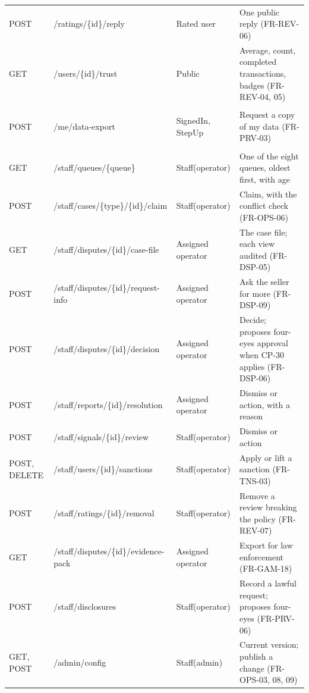\documentclass[11pt,a4paper]{article}
\begin{document}
{\begin{longtable}{@{}>{\ttfamily\raggedright\arraybackslash}p{1.55cm}>{\ttfamily\raggedright\arraybackslash}p{4.8cm}>{\raggedright\arraybackslash}p{2.4cm}>{\raggedright\arraybackslash}p{6.1cm}@{}}
POST & /\allowbreak ratings/\allowbreak \{id\}/\allowbreak reply & Rated user & One public reply (FR-REV-06) \\
GET & /\allowbreak users/\allowbreak \{id\}/\allowbreak trust & Public & Average, count, completed transactions, badges (FR-REV-04, 05) \\
\multicolumn{4}{@{}l}{\textbf{Privacy}} \\
POST & /\allowbreak me/\allowbreak data-\allowbreak export & SignedIn, StepUp & Request a copy of my data (FR-PRV-03) \\
\multicolumn{4}{@{}l}{\textbf{Staff} (operators unless stated)} \\
GET & /\allowbreak staff/\allowbreak queues/\allowbreak \{queue\} & Staff(operator) & One of the eight queues, oldest first, with age \\
POST & /\allowbreak staff/\allowbreak cases/\allowbreak \{type\}/\allowbreak \{id\}/\allowbreak claim & Staff(operator) & Claim, with the conflict check (FR-OPS-06) \\
GET & /\allowbreak staff/\allowbreak disputes/\allowbreak \{id\}/\allowbreak case-\allowbreak file & Assigned operator & The case file; each view audited (FR-DSP-05) \\
POST & /\allowbreak staff/\allowbreak disputes/\allowbreak \{id\}/\allowbreak request-\allowbreak info & Assigned operator & Ask the seller for more (FR-DSP-09) \\
POST & /\allowbreak staff/\allowbreak disputes/\allowbreak \{id\}/\allowbreak decision & Assigned operator & Decide; proposes four-eyes approval when CP-30 applies (FR-DSP-06) \\
POST & /\allowbreak staff/\allowbreak reports/\allowbreak \{id\}/\allowbreak resolution & Assigned operator & Dismiss or action, with a reason \\
POST & /\allowbreak staff/\allowbreak signals/\allowbreak \{id\}/\allowbreak review & Staff(operator) & Dismiss or action \\
POST, DELETE & /\allowbreak staff/\allowbreak users/\allowbreak \{id\}/\allowbreak sanctions & Staff(operator) & Apply or lift a sanction (FR-TNS-03) \\
POST & /\allowbreak staff/\allowbreak ratings/\allowbreak \{id\}/\allowbreak removal & Staff(operator) & Remove a review breaking the policy (FR-REV-07) \\
GET & /\allowbreak staff/\allowbreak disputes/\allowbreak \{id\}/\allowbreak evidence-\allowbreak pack & Assigned operator & Export for law enforcement (FR-GAM-18) \\
POST & /\allowbreak staff/\allowbreak disclosures & Staff(operator) & Record a lawful request; proposes four-eyes (FR-PRV-06) \\
GET, POST & /\allowbreak admin/\allowbreak config & Staff(admin) & Current version; publish a change (FR-OPS-03, 08, 09) \\
\bottomrule
\end{longtable}
}
\end{document}
